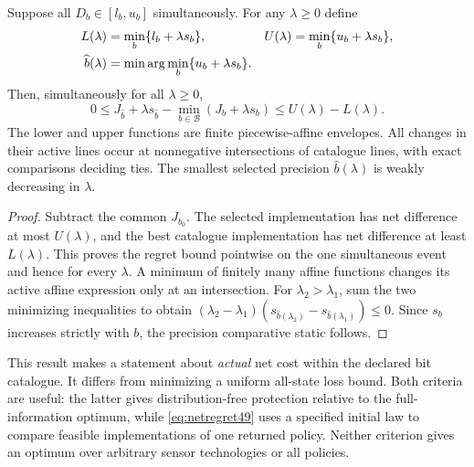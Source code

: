 \begin{theorem}\label{thm:net49}
Suppose all $D_b\in[l_b,u_b]$ simultaneously. For any $\lambda\ge0$ define
\begin{align}\label{eq:net49}
 L(\lambda)&=\min_b\{l_b+\lambda s_b\},&
 U(\lambda)&=\min_b\{u_b+\lambda s_b\},\\
 \widehat b(\lambda)&=\min\arg\min_b\{u_b+\lambda s_b\}.\notag
\end{align}
Then, simultaneously for all $\lambda\ge0$,
\begin{equation}\label{eq:netregret49}
 0\le J_{\widehat b}+\lambda s_{\widehat b}
       -\min_{b\in\mathcal B}(J_b+\lambda s_b)
 \le U(\lambda)-L(\lambda).
\end{equation}
The lower and upper functions are finite piecewise-affine envelopes. All changes in their active lines occur at nonnegative intersections of catalogue lines, with exact comparisons deciding ties. The smallest selected precision $\widehat b(\lambda)$ is weakly decreasing in $\lambda$.
\end{theorem}
\begin{proof}
Subtract the common $J_{b_0}$. The selected implementation has net difference at most $U(\lambda)$, and the best catalogue implementation has net difference at least $L(\lambda)$. This proves the regret bound pointwise on the one simultaneous event and hence for every $\lambda$. A minimum of finitely many affine functions changes its active affine expression only at an intersection. For $\lambda_2>\lambda_1$, sum the two minimizing inequalities to obtain $(\lambda_2-\lambda_1)(s_{\widehat b(\lambda_2)}-s_{\widehat b(\lambda_1)})\le0$. Since $s_b$ increases strictly with $b$, the precision comparative static follows.
\end{proof}

This result makes a statement about \emph{actual} net cost within the declared bit catalogue. It differs from minimizing a uniform all-state loss bound. Both criteria are useful: the latter gives distribution-free protection relative to the full-information optimum, while \eqref{eq:netregret49} uses a specified initial law to compare feasible implementations of one returned policy. Neither criterion gives an optimum over arbitrary sensor technologies or all policies.

